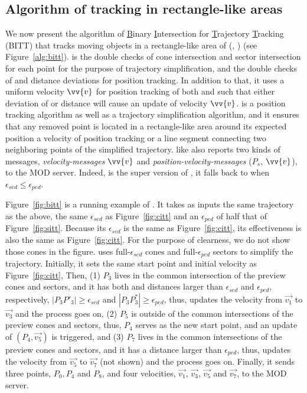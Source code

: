 \subsection{Algorithm of tracking in rectangle-like areas}
We now present the algorithm of \underline{B}inary \underline{I}ntersection for \underline{T}rajectory \underline{T}racking (BITT) that tracks moving objects in a rectangle-like area of \bed (\sed, \ped) (see Figure~\ref{alg:bitt}). 
%
\bitt is the double checks of cone intersection and sector intersection for each point for the purpose of trajectory simplification, and the double checks of \sed and \ped distance deviations for position tracking. In addition to that, it uses a uniform velocity $\vv{v}$ for position tracking of both \sed and \ped such that either deviation of \ped or \sed distance will cause an update of velocity $\vv{v}$. 
%
\bitt is a position tracking algorithm as well as a trajectory simplification algorithm, and it ensures that any removed point is located in a rectangle-like area around its expected position \wrt a velocity of position tracking or a line segment connecting two neighboring points of the simplified trajectory. 
%
\bitt like \citt also reports two kinds of messages, \ie \emph{velocity-messages} $\vv{v}$ and \emph{position-velocity-messages} ($P_s$, $\vv{v}$), to the MOD server. 
Indeed, \bitt is the super version of \citt, \ie it falls back to \citt when $\epsilon_{sed} \le \epsilon_{ped}$.

\begin{example}
	Figure~\ref{fig:bitt} is a running example of \bitt. It takes as inputs the same trajectory as the above, the same $\epsilon_{sed}$ as Figure~\ref{fig:citt} and an $\epsilon_{ped}$ of half that of Figure~\ref{fig:sitt}. Because its $\epsilon_{sed}$ is the same as Figure~\ref{fig:citt}, its effectiveness is also the same as Figure~\ref{fig:citt}. For the purpose of clearness, we do not show those cones in the figure.
	\bitt uses full-$\epsilon_{sed}$ cones and full-$\epsilon_{ped}$ sectors to simplify the trajectory. Initially, it sets the same start point and initial velocity as Figure~\ref{fig:citt}, 
	Then, (1) $P_3$ lives in the common intersection of the preview cones and sectors, and it has both \sed and \ped distances larger than $\epsilon_{sed}$ and $\epsilon_{ped}$, respectively, \ie $|P_3P'_3| \ge \epsilon_{sed}$ and $|P_3P^*_3| \ge \epsilon_{ped}$, thus, \bitt updates the velocity from $\vec{v_1}$ to $\vec{v_3}$ and the process goes on, (2) $P_5$ is outside of the common intersections of the preview cones and sectors, thus, $P_4$ serves as the new start point, and an update of $(P_4, \vec{v_5})$ is triggered, and (3) $P_7$ lives in the common intersections of the preview cones and sectors, and it has a \ped distance larger than $\epsilon_{ped}$, thus, \bitt updates the velocity from $\vec{v_5}$ to $\vec{v_7}$ (not shown) and the process goes on. Finally, it sends three points, $P_0, P_4$ and $P_8$, and four velocities, $\vec{v_1}$, $\vec{v_3}$, $\vec{v_5}$ and $\vec{v_7}$, to the MOD server. 
\end{example}

